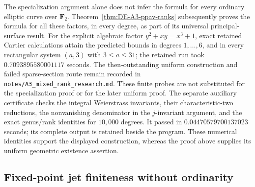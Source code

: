 \begin{remark}
\label{rem:DE-A3-mixed-fixed-refinement}
The specialization argument alone does not infer the formula for every
ordinary elliptic curve over $\overline{\mathbf F}_2$.
Theorem~\ref{thm:DE-A3-ppav-ranks} subsequently proves the formula
for all these factors, in every degree, as part of its universal
principal-surface result.  For the explicit algebraic
factor $y^2+xy=x^3+1$, exact retained Cartier calculations attain
the predicted bounds in degrees $1,\ldots,6$, and in every
rectangular system $(a,3)$ with $3\le a\le31$; the retained run
took $0.7093895580001117$ seconds.  The then-outstanding uniform
construction and failed sparse-section route remain recorded in
\texttt{notes/A3\_mixed\_rank\_research.md}.  These finite probes
are not substituted for the specialization proof or for the
later uniform proof.
The separate auxiliary certificate
checks the integral Weierstrass invariants, their characteristic-two
reductions, the nonvanishing denominator in the $j$-invariant argument,
and the exact genus/rank identities for $10{,}000$ degrees.  It passed
in $0.04470579700137023$ seconds; its complete output is retained
beside the program.  These numerical identities support the displayed
construction, whereas the proof above supplies its uniform geometric
existence assertion.
\end{remark}




\subsection{Fixed-point jet finiteness without ordinarity}
\label{subsec:nonordinary-ppav-fixed-jets-candidate}

